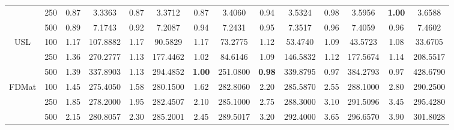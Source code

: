 \documentclass[preprint,12pt]{elsarticle}
\begin{document}
\begin{table}[!t]
{\begin{tabular}{cc|cccccccccccc}
                                       & 250    & 0.87          & 3.3363                    & 0.87          & 3.3712                    & 0.87          & 3.4060                    & 0.94          & 3.5324                    & 0.98          & 3.5956                    & \textbf{1.00} & 3.6588          \\
                                       & 500    & 0.89          & 7.1743                    & 0.92          & 7.2087                    & 0.94          & 7.2431                    & 0.95          & 7.3517                    & 0.96          & 7.4059                    & 0.96          & 7.4602          \\ \hline
\multirow{3}{*}{USL}                   & 100    & 1.17          & 107.8882                  & 1.17          & 90.5829                   & 1.17          & 73.2775                   & 1.12          & 53.4740                   & 1.09          & 43.5723                   & 1.08          & 33.6705         \\
                                       & 250    & 1.36          & 270.2777                  & 1.13          & 177.4462                  & 1.02          & 84.6146                   & 1.09          & 146.5832                  & 1.12          & 177.5674                  & 1.14          & 208.5517        \\
                                       & 500    & 1.39          & 337.8903                  & 1.13          & 294.4852                  & \textbf{1.00} & 251.0800                  & \textbf{0.98} & 339.8795                  & 0.97          & 384.2793                  & 0.97          & 428.6790        \\ \hline

 \multirow{3}{*}{FDMat}         &  100    &  1.45          &  275.4050                  &  1.58          &  280.1500                  &  1.62          &  282.8060                  &  2.20          &  285.5870                  &  2.55          &  288.1000                  &  2.80          &  290.2500         \\
                                       &  250    &  1.85          &  278.2000                  &  1.95          &  282.4507                  &  2.10          &  285.1000                  &  2.75          &  288.3000                  &  3.10          &  291.5096                  &  3.45          &  295.4280         \\
                                       &  500    &  2.15          &  280.8057                  &  2.30          &  285.2001                  &  2.45          &  289.5017                  &  3.20          &  292.4000                  &  3.65          &  296.6570                  &  3.90          &  301.8028         \\ \hline


\end{tabular}}
\end{table}
\end{document}
